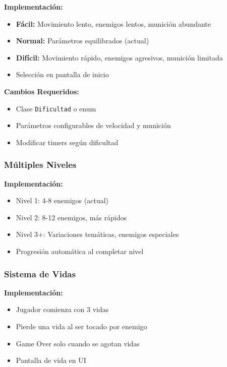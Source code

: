 \documentclass[12pt, a4paper]{article}
\begin{document}
\textbf{Implementación:}
\begin{itemize}[leftmargin=2em]
    \item \textbf{Fácil:} Movimiento lento, enemigos lentos, munición abundante
    \item \textbf{Normal:} Parámetros equilibrados (actual)
    \item \textbf{Difícil:} Movimiento rápido, enemigos agresivos, munición limitada
    \item Selección en pantalla de inicio
\end{itemize}

\textbf{Cambios Requeridos:}
\begin{itemize}[leftmargin=2em]
    \item Clase \texttt{Dificultad} o enum
    \item Parámetros configurables de velocidad y munición
    \item Modificar timers según dificultad
\end{itemize}

\subsubsection{Múltiples Niveles}

\textbf{Implementación:}
\begin{itemize}[leftmargin=2em]
    \item Nivel 1: 4-8 enemigos (actual)
    \item Nivel 2: 8-12 enemigos, más rápidos
    \item Nivel 3+: Variaciones temáticas, enemigos especiales
    \item Progresión automática al completar nivel
\end{itemize}

\subsubsection{Sistema de Vidas}

\textbf{Implementación:}
\begin{itemize}[leftmargin=2em]
    \item Jugador comienza con 3 vidas
    \item Pierde una vida al ser tocado por enemigo
    \item Game Over solo cuando se agotan vidas
    \item Pantalla de vida en UI
\end{itemize}
\end{document}
